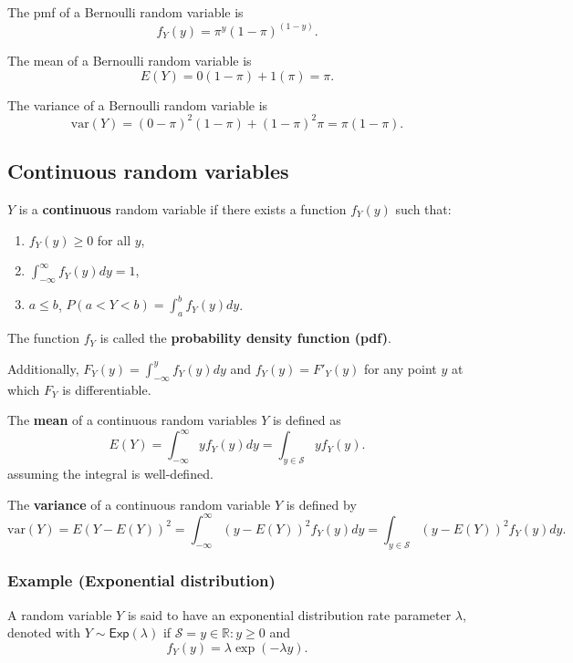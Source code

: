\documentclass[
]{book}
\providecommand{\tightlist}{%
  \setlength{\itemsep}{0pt}\setlength{\parskip}{0pt}}
\theoremstyle{definition}
\theoremstyle{definition}
\theoremstyle{definition}
\theoremstyle{definition}
\theoremstyle{remark}
\begin{document}
The pmf of a Bernoulli random variable is
\[f_Y(y) = \pi^y (1-\pi)^{(1-y)}.\]

The mean of a Bernoulli random variable is
\[E(Y)=0(1-\pi )+1(\pi)=\pi.\]

The variance of a Bernoulli random variable is \[\mathrm{var}(Y)=(0-\pi)^2(1-\pi)+(1-\pi)^2\pi = \pi(1-\pi).\]

\hypertarget{continuous-random-variables}{%
\subsection{Continuous random variables}\label{continuous-random-variables}}

\(Y\) is a \textbf{continuous} random variable if there exists a function \(f_Y (y)\) such that:

\begin{enumerate}
\def\labelenumi{\arabic{enumi}.}
\tightlist
\item
  \(f_Y (y)\geq 0\) for all \(y\),
\item
  \(\int_{-\infty}^\infty f_Y (y) dy = 1\),
\item
  \(a\leq b\), \(P(a<Y<b)=\int_a^b f_Y (y) dy\).
\end{enumerate}

The function \(f_Y\) is called the \textbf{probability density function (pdf)}.

Additionally, \(F_Y (y)=\int_{-\infty}^y f_Y (y) dy\) and \(f_Y (y)=F'_Y(y)\) for any point \(y\) at which \(F_Y\) is differentiable.

The \textbf{mean} of a continuous random variables \(Y\) is defined as
\[
E(Y) =
\int_{-\infty}^{\infty} y f_Y(y)  dy =
\int_{y\in\mathcal{S}} y f_Y(y).
\]
assuming the integral is well-defined.

The \textbf{variance} of a continuous random variable \(Y\) is defined by
\[
\mathrm{var}(Y)=
E(Y-E(Y))^2=\int_{-\infty}^{\infty} (y - E(Y))^2 f_Y(y)  dy =
\int_{y\in\mathcal{S}} (y - E(Y))^2 f_Y(y) dy.
\]

\hypertarget{example-exponential-distribution}{%
\subsubsection{Example (Exponential distribution)}\label{example-exponential-distribution}}

A random variable \(Y\) is said to have an exponential distribution rate parameter \(\lambda\), denoted with \(Y \sim \mathsf{Exp}(\lambda)\) if \(\mathcal{S} = {y\in \mathbb{R}:y\geq 0}\) and
\[f_Y(y)=\lambda\exp(-\lambda y).\]
\end{document}
